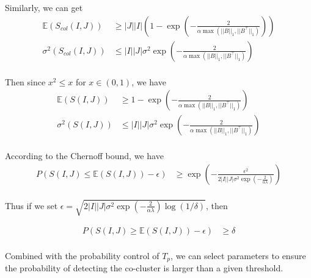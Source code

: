 Similarly, we can get
\begin{align*}
    \mathbb{E}(S_{col}(I,J)) & \ge |J||I| \left(1 - \exp(-\frac{2}{\alpha \max(||B||_1, ||B^\top||_1)}) \right) \\
    \sigma^2(S_{col}(I,J))   & \le |I||J| \sigma^2 \exp(-\frac{2}{\alpha \max(||B||_1, ||B^\top||_1)})          \\
\end{align*}

Then since $x^2 \le x$ for $x \in (0,1)$, we have
\begin{align*}
    \mathbb{E}(S(I,J)) & \ge 1 - \exp(-\frac{2}{\alpha \max(||B||_1, ||B^\top||_1)})             \\
    \sigma^2(S(I,J))   & \le |I||J| \sigma^2 \exp(-\frac{2}{\alpha \max(||B||_1, ||B^\top||_1)}) \\
\end{align*}

According to the Chernoff bound, we have
\begin{align*}
    P(S(I,J) \le \mathbb{E}(S(I,J)) - \epsilon)
     & \ge \exp(-\frac{\epsilon^2}{2|I||J| \sigma^2 \exp(-\frac{2}{\alpha \lambda})}) \\
\end{align*}

Thus if we set $\epsilon = \sqrt{2|I||J| \sigma^2 \exp(-\frac{2}{\alpha \lambda}) \log(1/\delta)}$, then

\begin{align*}
    P(S(I,J) \ge \mathbb{E}(S(I,J)) - \epsilon) & \ge \delta \\
\end{align*}

Combined with the probability control of $T_p$, we can select parameters to ensure the probability of detecting the co-cluster is larger than a given threshold.

